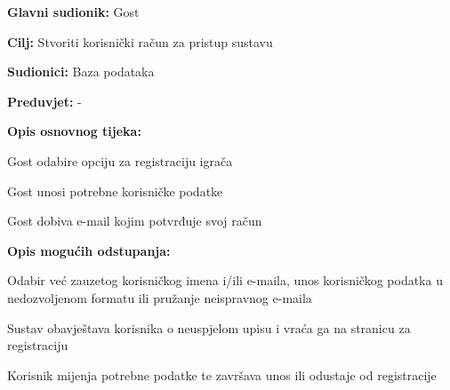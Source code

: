 				
					\noindent {}
					\begin{packed_item}
	
						\item \textbf{Glavni sudionik: }Gost
						\item  \textbf{Cilj:} Stvoriti korisnički račun za pristup sustavu
						\item  \textbf{Sudionici:} Baza podataka
						\item  \textbf{Preduvjet:} -
						\item  \textbf{Opis osnovnog tijeka:}
						
						\item[] \begin{packed_enum}
	
							\item Gost odabire opciju za registraciju igrača
							\item Gost unosi potrebne korisničke podatke
							\item Gost dobiva e-mail kojim potvrđuje svoj račun

						\end{packed_enum}
						
						\item  \textbf{Opis mogućih odstupanja:}
						
						\item[] \begin{packed_item}
	
							\item[2.a] Odabir već zauzetog korisničkog imena i/ili e-maila, unos korisničkog podatka u nedozvoljenom formatu ili pružanje neispravnog e-maila
							\item[] \begin{packed_enum}
								
								\item Sustav obavještava korisnika o neuspjelom upisu i vraća ga na stranicu za registraciju
								\item Korisnik mijenja potrebne podatke te završava unos ili odustaje od registracije
								
							\end{packed_enum}
							
						\end{packed_item}
					\end{packed_item}
					
